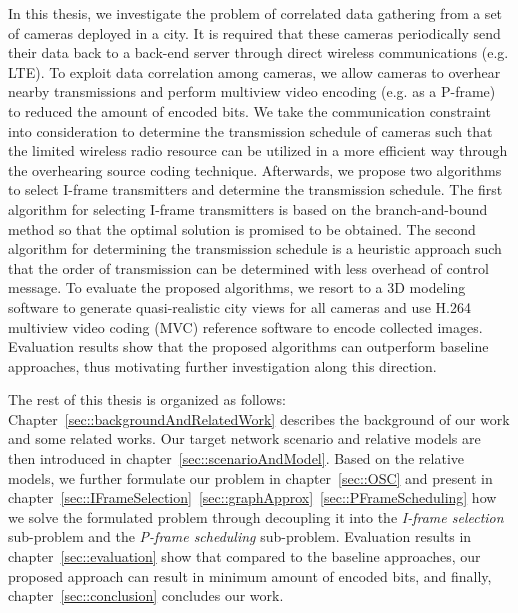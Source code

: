 In this thesis, we investigate the problem of correlated data gathering from a set of cameras deployed in a city.
It is required that these cameras periodically send their data back to a back-end server through direct wireless communications (e.g. LTE).
To exploit data correlation among cameras, we allow cameras to overhear nearby transmissions and perform multiview video encoding (e.g. as a P-frame) to reduced the amount of encoded bits.
We take the communication constraint into consideration to determine the transmission schedule of cameras such that the limited wireless radio resource can be utilized in a more efficient way through the overhearing source coding technique.
Afterwards, we propose two algorithms to select I-frame transmitters and determine the transmission schedule.
The first algorithm for selecting I-frame transmitters is based on the branch-and-bound method so that the optimal solution is promised to be obtained.
The second algorithm for determining the transmission schedule is a heuristic approach such that the order of transmission can be determined with less overhead of control message.
To evaluate the proposed algorithms, we resort to a 3D modeling software to generate quasi-realistic city views for all cameras and use H.264 multiview video coding (MVC) reference software to encode collected images.
Evaluation results show that the proposed algorithms can outperform baseline approaches, thus motivating further investigation along this direction.

The rest of this thesis is organized as follows:
Chapter~\ref{sec::backgroundAndRelatedWork} describes the background of our work and some related works.
Our target network scenario and relative models are then introduced in chapter~\ref{sec::scenarioAndModel}.
Based on the relative models, we further formulate our problem in chapter~\ref{sec::OSC} and present in chapter~\ref{sec::IFrameSelection}~\ref{sec::graphApprox}~\ref{sec::PFrameScheduling} how we solve the formulated problem through decoupling it into the {\em I-frame selection} sub-problem and the {\em P-frame scheduling} sub-problem. 
Evaluation results in chapter~\ref{sec::evaluation} show that compared to the baseline approaches, our proposed approach can result in minimum amount of encoded bits, and finally, chapter~\ref{sec::conclusion} concludes our work.